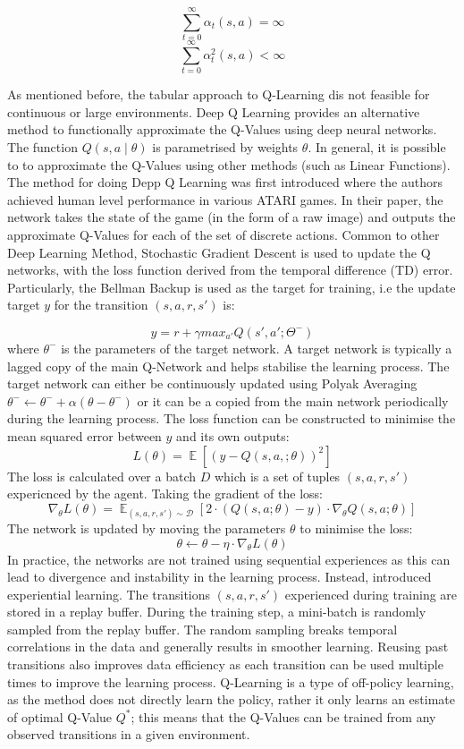 \documentclass[12pt,a4paper]{report}
\DeclareMathOperator{\EX}{\mathbb{E}}
\begin{document}
\[
\sum_{t=0}^{\infty} \alpha_t(s, a) = \infty
\]
\[
\sum_{t=0}^{\infty} \alpha_t^2(s, a) < \infty
\]

As mentioned before, the tabular approach to Q-Learning dis not feasible for continuous or large environments. Deep Q Learning provides an alternative method to functionally approximate the Q-Values using deep neural networks. The function $Q(s, a \mid \theta)$ is parametrised by weights $\theta$. In general, it is possible to to approximate the Q-Values using other methods (such as Linear Functions).
The method for doing Depp Q Learning was first introduced \cite{Mnih2015} where the authors achieved human level performance in various ATARI games. In their paper, the network takes the state of the game (in the form of a raw image) and outputs the approximate Q-Values for each of the set of discrete actions. Common to other Deep Learning Method, Stochastic Gradient Descent is used to update the Q networks, with the loss function derived from the temporal difference (TD) error. Particularly, the Bellman Backup is used as the target for training, i.e the update target $y$ for the transition $(s, a, r, s')$ is: 

\[
  y = r + \gamma max_{a'} Q(s', a'; \Theta^-)
\]
where $\theta^-$ is the parameters of the target network. A target network is typically a lagged copy of the main Q-Network and helps stabilise the learning process. The target network can either be continuously updated using Polyak Averaging $\theta^- \leftarrow \theta^-+ \alpha (\theta - \theta^-)$ or it can be a copied from the main network periodically during the learning process. 
The loss function can be constructed to minimise the mean squared error between $y$ and its own outputs: 
\[
  L(\theta) = \EX[(y - Q(s, a, ; \theta))^2]
\] 
The loss is calculated over a batch $D$ which is a set of tuples $(s, a, r, s')$ expericnced by the agent. Taking the gradient of the loss:
\[
\nabla_{\theta} L(\theta) = \EX_{(s, a, r, s') \sim \mathcal{D}} [ 2 \cdot \left( Q(s, a; \theta) - y \right) \cdot \nabla_{\theta} Q(s, a; \theta) ]
\]
The network is updated by moving the parameters $\theta$ to minimise the loss:
\[
  \theta \leftarrow \theta - \eta \cdot \nabla_{\theta} L(\theta)
\] 
In practice, the networks are not trained using sequential experiences as this can lead to divergence and instability in the learning process. Instead, \cite{Mnih2015} introduced experiential learning. The transitions $(s, a, r, s')$ experienced during training are stored in a replay buffer. During the training step, a mini-batch is randomly sampled from the replay buffer. The random sampling breaks temporal correlations in the data and generally results in smoother learning. Reusing past transitions also improves data efficiency as each transition can be used multiple times to improve the learning process. Q-Learning is a type of off-policy learning, as the method does not directly learn the policy, rather it only learns an estimate of optimal Q-Value $Q^*$; this means that the Q-Values can be trained from any observed transitions in a given environment. 
\end{document}
